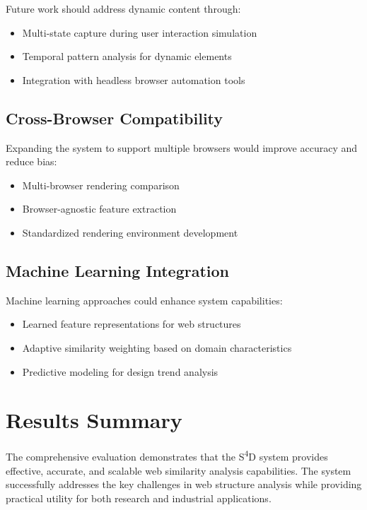 Future work should address dynamic content through:
\begin{itemize}
    \item Multi-state capture during user interaction simulation
    \item Temporal pattern analysis for dynamic elements
    \item Integration with headless browser automation tools
\end{itemize}

\subsection{Cross-Browser Compatibility}
\label{subsec:cross-browser}

Expanding the system to support multiple browsers would improve accuracy and reduce bias:
\begin{itemize}
    \item Multi-browser rendering comparison
    \item Browser-agnostic feature extraction
    \item Standardized rendering environment development
\end{itemize}

\subsection{Machine Learning Integration}
\label{subsec:ml-integration}

Machine learning approaches could enhance system capabilities:
\begin{itemize}
    \item Learned feature representations for web structures
    \item Adaptive similarity weighting based on domain characteristics
    \item Predictive modeling for design trend analysis
\end{itemize}

\section{Results Summary}
\label{sec:results-summary}

The comprehensive evaluation demonstrates that the S\textsuperscript{4}D system provides effective, accurate, and scalable web similarity analysis capabilities. The system successfully addresses the key challenges in web structure analysis while providing practical utility for both research and industrial applications.

